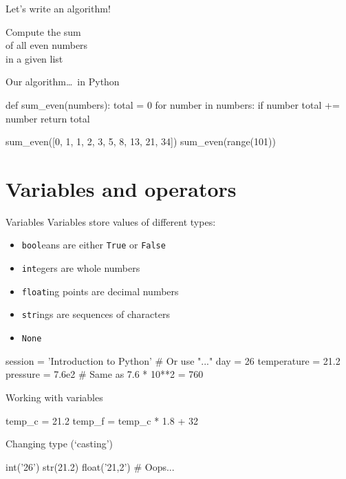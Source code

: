 \begin{frame}{Let's write an algorithm!}
    \begin{center}
        \Large%
        Compute the sum \\
        of all even numbers \\
        in a given list
    \end{center}
\end{frame}

\begin{frame}[fragile]{Our algorithm\ldots~in Python}
    \begin{py3}
        def sum_even(numbers):
            total = 0
            for number in numbers:
                if number %
                    total += number
            return total
    \end{py3}
    \vfill
    \begin{py3}
        sum_even([0, 1, 1, 2, 3, 5, 8, 13, 21, 34])
        sum_even(range(101))
    \end{py3}
\end{frame}

\section{Variables and operators}

\begin{frame}[fragile]{Variables}
    Variables store values of different \alert{types}:
    \begin{itemize}
        \item \texttt{bool}eans are either \texttt{True}
              or \texttt{False}
        \item \texttt{int}egers are whole numbers
        \item \texttt{float}ing points are decimal numbers
        \item \texttt{str}ings are sequences of characters
        \item \texttt{None}
    \end{itemize}
    \vfill
    \begin{py3}
        session = 'Introduction to Python'  # Or use "..."
        day = 26
        temperature = 21.2
        pressure = 7.6e2  # Same as 7.6 * 10**2 = 760
    \end{py3}
\end{frame}

\begin{frame}[fragile]{Working with variables}
    \begin{py3}
        temp_c = 21.2
        temp_f = temp_c * 1.8 + 32
    \end{py3}
    \vfill\pause
    \begin{block}{Changing type (`casting')}
        \begin{py3}
            int('26')
            str(21.2)
            float('21,2')  # Oops...
        \end{py3}
    \end{block}
\end{frame}

